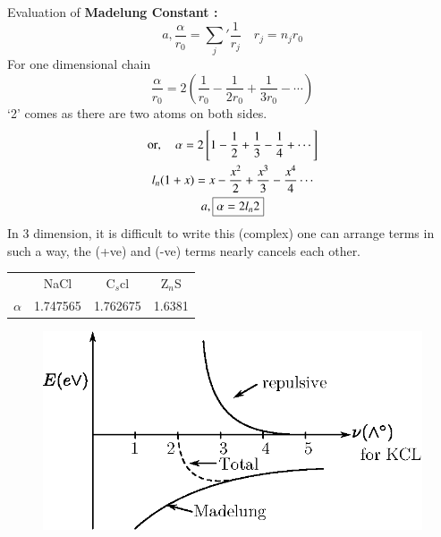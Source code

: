 Evaluation of {\bf Madelung Constant :} 
$$
a, \frac{\alpha}{r_{0}}={\sum\limits_{j}}'\frac{1}{r_{j}}\quad r_{j}=n_{j}r_{0}
$$
For one dimensional chain
$$
\dfrac{\alpha}{r_{0}}=2\left(\frac{1}{r_{0}}-\frac{1}{2r_{0}}+\frac{1}{3r_{0}}-\cdots\right)
$$
`2' comes as there are two atoms on both sides.
\begin{gather*}
\text{or},\quad \alpha=2\left[1-\frac{1}{2}+\frac{1}{3}-\frac{1}{4}+\cdots\right]\\
l_{n}(1+x)=x-\frac{x^{2}}{2}+\frac{x^{3}}{3}-\frac{x^{4}}{4}\cdots\\
a, \fbox{$\alpha=2l_{n}2$}
\end{gather*}
In 3 dimension, it is difficult to write this (complex) one can arrange terms in such a way, the (+ve) and (-ve) terms nearly cancels each other.
\begin{center}
\begin{tabular}{lccc}
 & NaCl & C$_{s}$cl & Z$_{n}$S\\
$\alpha$ & 1.747565 & 1.762675 & 1.6381
\end{tabular}
\end{center}
\begin{figure}[H]
\centering
\includegraphics{images/lecture15/fig3.eps}
\end{figure}

